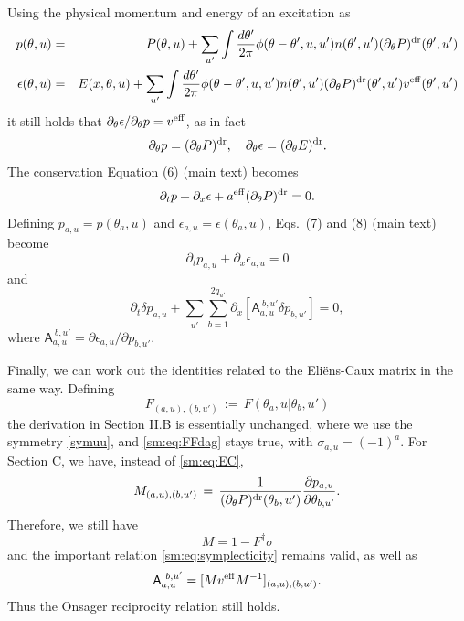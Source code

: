 \documentclass[twocolumn,amsfonts,showpacs,superscriptaddress]{revtex4-1}
\begin{document}
\begin{widetext}
Using the physical momentum and energy of an excitation as
\begin{eqnarray}
p(\theta,u) &=& P(\theta,u) + \sum_{u'}\int \frac{d\theta'}{2\pi} \phi(\theta-\theta',u,u') n(\theta',u')(\partial_\theta P)^{\rm dr}(\theta',u')\\
\epsilon(\theta,u) &=&  E(x,\theta,u) + \sum_{u'}\int \frac{d\theta'}{2\pi} \phi(\theta-\theta',u,u')n(\theta',u')(\partial_\theta P)^{\rm dr}(\theta',u')v^{\rm eff}(\theta',u')
\end{eqnarray}
it still holds that $\partial_\theta \epsilon / \partial_\theta p = v^{\rm eff}$, as in fact
\begin{equation}
	\partial_\theta p = (\partial_\theta P)^{\rm dr},\quad
	\partial_\theta \epsilon = (\partial_\theta E)^{\rm dr}.
\end{equation}
The conservation Equation (6) (main text) becomes
\begin{equation}
	\partial_t p + \partial_x \epsilon + a^{\rm eff} (\partial_\theta P)^{\rm dr}=0.
\end{equation}
Defining $p_{a,u} = p(\theta_a,u)$  and  $\epsilon_{a,u} = \epsilon(\theta_a,u)$, Eqs.~(7) and (8) (main text) become
\begin{equation}
	\partial_t p_{a,u} + \partial_x \epsilon_{a,u} = 0
\end{equation}
and
\begin{equation}
	\partial_t \delta p_{a,u} + \sum_{u'}\sum_{b=1}^{2q_{u'}}\partial_x[\mathsf A_{a,u}^{~b,u'} \delta p_{b,u'}] = 0,
\end{equation}
where $ \mathsf A_{a,u}^{~b,u'} = \partial \epsilon_{a,u}/\partial p_{b,u'}$. 

Finally, we can work out the identities related to the Eli\"ens-Caux matrix in the same way. Defining
\begin{equation}
	F_{(a,u),(b,u')} \,:=\, F(\theta_a,u | \theta_b,u')
\end{equation}
the derivation in Section II.B is essentially unchanged, where we use the symmetry \eqref{symuu}, and \eqref{sm:eq:FFdag} stays true, with $\sigma_{a,u} = (-1)^a$. For Section C, we have, instead of \eqref{sm:eq:EC},
\begin{equation}
	M_{(a,u),(b,u')} \, = \, \frac{1}{(\partial_\theta P)^{\rm dr}(\theta_b,u')} \frac{\partial p_{a,u}}{ \partial \theta_{b,u'}} .
\end{equation}
Therefore, we still have
\begin{equation}
	M = 1-F^\dag \sigma
\end{equation}
and the important relation \eqref{sm:eq:symplecticity} remains valid, as well as
\begin{equation}
	\mathsf A_{a,u}^{~b,u'} = [Mv^{\rm eff}M^{-1}]_{(a,u),(b,u')}.
\end{equation}
Thus the Onsager reciprocity relation still holds.


\end{widetext}
\end{document}
